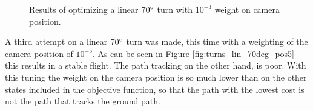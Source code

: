 \begin{figure}[h]
{	\qquad
	}
	\caption{Results of optimizing a linear $70\degree$ turn with $10^{-3}$ weight on camera position.}
	\label{fig:turns_lin_70deg_pos3}
\end{figure}

A third attempt on a linear $70\degree$ turn was made, this time with a weighting of the camera position of $10^{-5}$. As can be seen in Figure \ref{fig:turns_lin_70deg_pos5} this results in a stable flight. The path tracking on the other hand, is poor. With this tuning the weight on the camera position is so much lower than on the other states included in the objective function, so that the path with the lowest cost is not the path that tracks the ground path.

